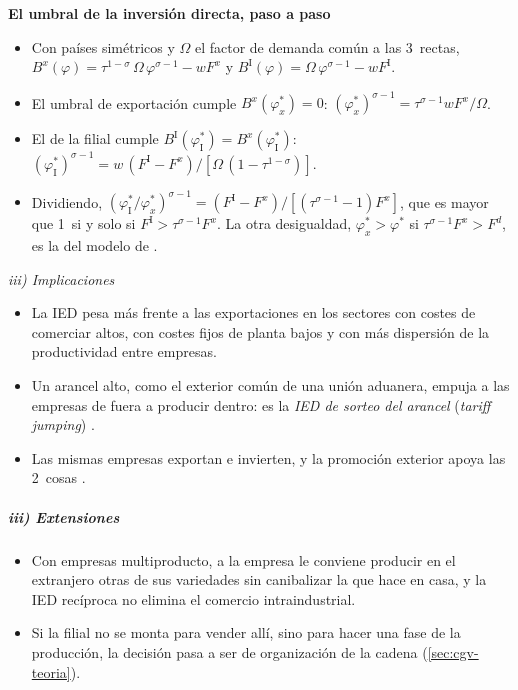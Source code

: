 \documentclass[11pt]{article}
\begin{document}
\begin{anotaciones}
\textbf{El umbral de la inversión directa, paso a paso}
\begin{itemize}
\item Con países simétricos y $\Omega$ el factor de demanda común a las 3~rectas, $B^x(\varphi)=\tau^{1-\sigma}\,\Omega\,\varphi^{\sigma-1}-wF^x$ y $B^{\mathrm I}(\varphi)=\Omega\,\varphi^{\sigma-1}-wF^{\mathrm I}$.
\item El umbral de exportación cumple $B^x(\varphi^*_x)=0$: $(\varphi^*_x)^{\sigma-1}=\tau^{\sigma-1}wF^x/\Omega$.
\item El de la filial cumple $B^{\mathrm I}(\varphi^*_{\mathrm I})=B^x(\varphi^*_{\mathrm I})$: $(\varphi^*_{\mathrm I})^{\sigma-1}=w\,(F^{\mathrm I}-F^x)/[\Omega\,(1-\tau^{1-\sigma})]$.
\item Dividiendo, $\left(\varphi^*_{\mathrm I}/\varphi^*_x\right)^{\sigma-1}=(F^{\mathrm I}-F^x)/[(\tau^{\sigma-1}-1)F^x]$, que es mayor que 1~si y solo si $F^{\mathrm I}>\tau^{\sigma-1}F^x$. La otra desigualdad, $\varphi^*_x>\varphi^*$ si $\tau^{\sigma-1}F^x>F^d$, es la del modelo de  . \findemo
\end{itemize}
\end{anotaciones}

\hspace*{3.6em}\emph{iii) Implicaciones}

\begin{itemize}
\item La IED pesa más frente a las exportaciones en los sectores con costes de comerciar altos, con costes fijos de planta bajos y con más dispersión de la productividad entre empresas.
\item Un arancel alto, como el exterior común de una unión aduanera, empuja a las empresas de fuera a producir dentro: es la \emph{IED de sorteo del arancel} (\emph{tariff jumping}) .
\item Las mismas empresas exportan e invierten, y la promoción exterior apoya las 2~cosas .
\end{itemize}

\subparagraph{iii) Extensiones}

\begin{itemize}
\item Con empresas multiproducto, a la empresa le conviene producir en el extranjero otras de sus variedades sin canibalizar la que hace en casa, y la IED recíproca no elimina el comercio intraindustrial\nocite{BaldwinOttaviano2001Multiproduct}.
\item Si la filial no se monta para vender allí, sino para hacer una fase de la producción, la decisión pasa a ser de organización de la cadena (\ref{sec:cgv-teoria}).
\end{itemize}
\end{document}
